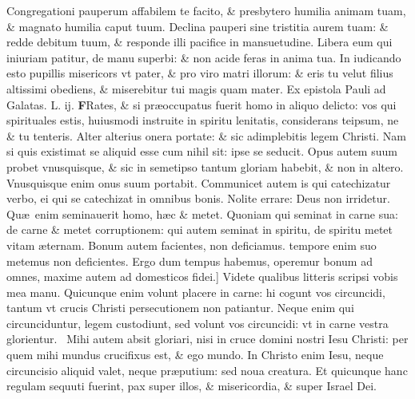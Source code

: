 \documentclass[a5paper,10pt]{book}
\def\leftmarginnote{%
	\lrmarginnote{\hskip -\marginparsep \hskip -6.5em}}
\def\ae{æ}
\begin{document}
\begin{multicols*}{2}
Congregationi pauperum affabilem te facito, \& presbytero humilia animam tuam, \& magnato humilia caput tuum.
Declina pauperi sine tristitia aurem tuam: \& redde debitum tuum, \& responde illi pacifice in mansuetudine.
Libera eum qui iniuriam patitur, de manu superbi: \& non acide feras in anima tua. In iudicando esto pupillis misericors vt pater, \& pro viro
matri illorum: \& eris tu velut filius altissimi obediens, \& miserebitur tui magis quam mater.
\newline {} \color{red} Ex epistola Pauli ad Galatas. \hfill L. ij. \color{black}
\vspace{-.25em}
\lettrine[lines=2]{\bfseries \color{red} F}{}Rates, \& si\leftmarginnote{\begin{flushright}c.6.d\end{flushright}} pr\ae occupatus fuerit homo in aliquo delicto: vos qui spirituales estis, huiusmodi instruite in spiritu lenitatis, considerans teipsum, ne \& tu tenteris.
Alter alterius onera portate: \& sic adimplebitis legem Christi. Nam si quis existimat se aliquid esse cum nihil sit: ipse se seducit.
Opus autem suum probet vnusquisque, \& sic in semetipso tantum gloriam habebit, \& non in altero. Vnusquisque enim onus suum portabit.
Communicet autem is qui catechizatur verbo, ei qui se catechizat in omnibus bonis. Nolite errare: Deus non irridetur.
Qu\ae \ enim seminauerit homo, h\ae c \& metet. Quoniam qui seminat in carne sua: de carne \& metet corruptionem: qui autem seminat in spiritu, de spiritu metet vitam \ae ternam.
Bonum autem facientes, non deficiamus. tempore enim suo metemus non deficientes. Ergo dum tempus habemus, operemur bonum ad omnes, maxime autem ad domesticos fidei.]
Videte\leftmarginnote{\begin{flushright}E\end{flushright}} qualibus litteris scripsi vobis mea manu.
\newline Quicunque enim volunt placere in carne: hi cogunt vos circuncidi, tantum vt crucis Christi persecutionem non patiantur.
Neque enim qui circunciduntur, legem custodiunt, sed volunt vos circuncidi: vt in carne vestra glorientur. \textdagger \ 
Mihi\leftmarginnote{\begin{flushright}A\end{flushright}} autem absit gloriari, nisi in cruce domini nostri Iesu Christi: per quem mihi mundus crucifixus est, \& ego mundo.
In Christo enim Iesu, neque circuncisio aliquid valet, neque pr\ae putium: sed noua creatura.
Et quicunque hanc regulam sequuti fuerint, pax super illos, \& misericordia, \& super Israel Dei.

\end{multicols*}
\end{document}
